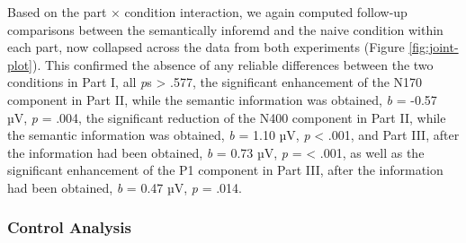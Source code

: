 \documentclass[
  english,
  man,11pt,floatsintext]{apa7}
\begin{document}
Based on the part × condition interaction, we again computed follow-up comparisons between the semantically inforemd and the naive condition within each part, now collapsed across the data from both experiments (Figure \ref{fig:joint-plot}). This confirmed the absence of any reliable differences between the two conditions in Part I, all \emph{p}s \textgreater{} .577, the significant enhancement of the N170 component in Part II, while the semantic information was obtained, \emph{b} = -0.57 µV, \emph{p} = .004, the significant reduction of the N400 component in Part II, while the semantic information was obtained, \emph{b} = 1.10 µV, \emph{p} \textless{} .001, and Part III, after the information had been obtained, \emph{b} = 0.73 µV, \emph{p} = \textless{} .001, as well as the significant enhancement of the P1 component in Part III, after the information had been obtained, \emph{b} = 0.47 µV, \emph{p} = .014.

\hypertarget{control-analysis}{%
\subsubsection{Control Analysis}\label{control-analysis}}
\end{document}
